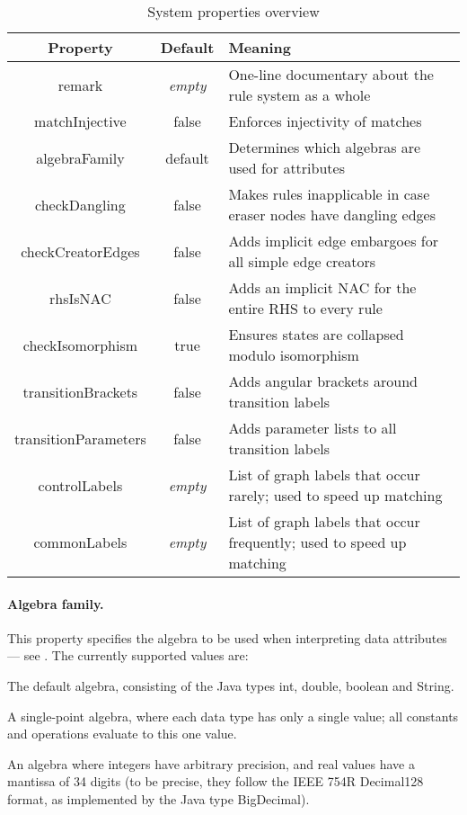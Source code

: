 \begin{table}
\begin{center}
\begin{tabular}{|c|c|l|}
\hline\hline
\bf Property & \bf Default & \bf Meaning \\
\hline
\sf remark
  & \it empty
  & One-line documentary about the rule system as a whole \\
\sf matchInjective 
  & \sf false
  & Enforces injectivity of matches \\
\sf algebraFamily 
  & \sf default
  & Determines which algebras are used for attributes \\
\sf checkDangling
  & \sf false
  & Makes rules inapplicable in case eraser nodes have dangling edges \\
\sf checkCreatorEdges
  & \sf false
  & Adds implicit edge embargoes for all simple edge creators \\
\sf rhsIsNAC
  & \sf false
  & Adds an implicit NAC for the entire RHS to every rule \\
\sf checkIsomorphism
  & \sf true
  & Ensures states are collapsed modulo isomorphism \\
\sf transitionBrackets
  & \sf false
  & Adds angular brackets around transition labels
  \\
\sf transitionParameters
  & \sf false
  & Adds parameter lists to all transition labels \\
\sf controlLabels 
  & \it empty
  & List of graph labels that occur rarely; used to speed up matching \\
\sf commonLabels
  & \it empty
  & List of graph labels that occur frequently; used to speed up matching \\
\hline\hline
\end{tabular}
\end{center}
\caption{System properties overview}
\vspace*{-\medskipamount}
\vspace*{-\medskipamount}
\end{table}

\paragraph{Algebra family.}

This property specifies the algebra to be used when interpreting data
attributes --- see . The currently supported values are:
%
\begin{description}\noitemsep
\item[\textsf{default}] The default algebra, consisting of the Java types
  \textsf{int}, \textsf{double}, \textsf{boolean} and \textsf{String}.
\item[\textsf{point}] A single-point algebra, where each data type has only a
  single value; all constants and operations evaluate to this one value.
\item[\textsf{big}] An algebra where integers have arbitrary precision, and
  real values have a mantissa of 34 digits (to be precise, they follow the
  IEEE 754R Decimal128 format, as implemented by the Java type
  \textsf{BigDecimal}).
\end{description}

